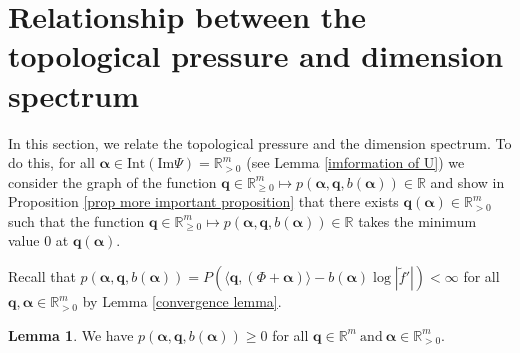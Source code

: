 \documentclass{article}
\theoremstyle{definition}
\newtheorem{lemma}[thm]{Lemma}
\begin{document}
\section{Relationship between the topological pressure and dimension spectrum}\label{Relationship between the topological pressure and dimension spectrum}
In this section, we relate the topological pressure and the dimension spectrum. To do this, for all $\boldsymbol{\alpha}\in \text{Int}(\text{Im}\Psi)=\mathbb{R}_{>0}^m$ (see Lemma \ref{imformation of U}) we consider the graph of the function $\boldsymbol{q}\in\mathbb{R}^m_{\geq 0}\mapsto p(\boldsymbol{\alpha},\boldsymbol{q},b(\boldsymbol{\alpha}))\in\mathbb{R}$ and show in Proposition \ref{prop more important proposition}
  that there exists $\boldsymbol{q}(\boldsymbol{\alpha})\in\mathbb{R}_{>0}^m$ such that the function  $\boldsymbol{q}\in\mathbb{R}_{\geq 0}^m\mapsto p(\boldsymbol{\alpha},\boldsymbol{q},b(\boldsymbol{\alpha}))\in\mathbb{R}$ takes the minimum value $0$ at $\boldsymbol{q}(\boldsymbol{\alpha})$.  

Recall that $p(\boldsymbol{\alpha},\boldsymbol{q},b(\boldsymbol{\alpha}))=P(\langle\boldsymbol{q},(\Phi+\boldsymbol{\alpha})\rangle-b(\boldsymbol{\alpha})\log|\tilde f'|)<\infty$ for all $\boldsymbol{q},\boldsymbol{\alpha}\in\mathbb{R}_{>0}^m$ by Lemma \ref{convergence lemma}.
\begin{lemma}\label{positivity}
We have 
$\nonumber
     p(\boldsymbol{\alpha},\boldsymbol{q},b(\boldsymbol{\alpha}))\geq0$
for all $\boldsymbol{q}\in \mathbb{R}^m\  \text{and}\  \boldsymbol{\alpha}\in  \mathbb{R}^m_{>0}$.     
\end{lemma}
\end{document}
